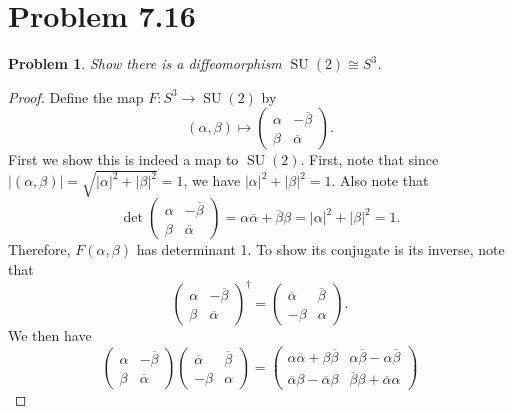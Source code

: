 \documentclass[11pt, letterpaper]{article}
\theoremstyle{plain}
\newtheorem{problem}{Problem}
\begin{document}
\section{Problem 7.16}
\begin{problem}\label{6}
	Show there is a diffeomorphism $\operatorname{SU} (2)\cong S^3$.
\end{problem}
\begin{proof}
	Define the map $F : S^3 \to \operatorname{SU} (2)$ by
	\[
		(\alpha ,\beta )\mapsto \begin{pmatrix}
		\alpha  & - \overline{\beta }  \\
		\beta  & \overline{\alpha } 
		\end{pmatrix}
	.\]
	First we show this is indeed a map to $\operatorname{SU} (2)$. First, note that since $\left| (\alpha ,\beta ) \right| =\sqrt{\left| \alpha  \right| ^2+\left| \beta  \right| ^2} =1$, we have $\left| \alpha  \right|^2+\left| \beta  \right| ^2=1$. Also note that
	\[
		\det \begin{pmatrix}
		\alpha  & - \overline{\beta }  \\
		\beta  & \overline{\alpha } 
		\end{pmatrix}=\alpha \overline{\alpha } + \overline{\beta } \beta = \left| \alpha  \right| ^2+\left| \beta  \right| ^2=1
	.\]
	Therefore, $F(\alpha ,\beta )$ has determinant 1. To show its conjugate is its inverse, note that
	\[
		\begin{pmatrix}
		\alpha  & - \overline{\beta }  \\
		\beta  & \overline{\alpha } 
		\end{pmatrix}^\dagger = \begin{pmatrix}
		\overline{\alpha }  & \overline{\beta }  \\
		-\beta  & \alpha 
		\end{pmatrix}
	.\]
	We then have
	\[
		\begin{pmatrix}
		\alpha  & - \overline{\beta }  \\
		\beta  & \overline{\alpha } 
		\end{pmatrix}\begin{pmatrix}
		\overline{\alpha }  & \overline{\beta }  \\
		- \beta  & \alpha 
		\end{pmatrix}=\begin{pmatrix}
		\alpha \overline{\alpha } +\beta \overline{\beta }  & \alpha \overline{\beta } -\alpha \overline{\beta }  \\
		\overline{\alpha } \beta - \overline{\alpha } \beta  & \overline{\beta } \beta + \overline{\alpha } \alpha 

\end{pmatrix}\]
\end{proof}
\end{document}
